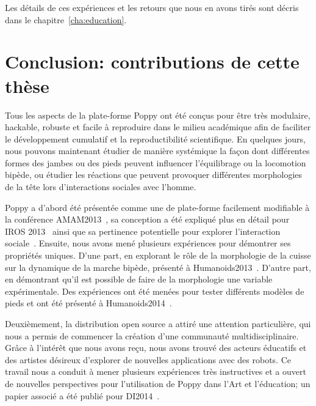 Les détails de ces expériences et les retours que nous en avons tirés sont décris dans le chapitre~\ref{cha:education}.


\section*{Conclusion: contributions de cette thèse} %

Tous les aspects de la plate-forme Poppy ont été conçus pour être très modulaire, hackable, robuste et facile à reproduire dans le milieu académique afin de faciliter le développement cumulatif et la reproductibilité scientifique. En quelques jours, nous pouvons maintenant étudier de manière systémique la façon dont différentes formes des jambes ou des pieds peuvent influencer l'équilibrage ou la locomotion bipède, ou étudier les réactions que peuvent provoquer différentes morphologies de la tête lors d’interactions sociales avec l'homme.

Poppy a d'abord été présentée comme une de plate-forme facilement modifiable à la conférence AMAM2013~\parencite{lapeyre:hal-00788433}, sa conception a été expliqué plus en détail pour IROS 2013~\parencite{lapeyre:hal-00852858} ainsi que sa pertinence potentielle pour explorer l'interaction sociale~\parencite{lapeyre:hal-00984312}. Ensuite, nous avons mené plusieurs expériences pour démontrer ses propriétés uniques. D'une part, en explorant le rôle de la morphologie de la cuisse sur la dynamique de la marche bipède, présenté à Humanoids2013~\parencite{lapeyre:hal-00861110}. D'autre part, en démontrant qu'il est possible de faire de la morphologie une variable expérimentale. Des expériences ont été menées pour tester différents modèles de pieds et ont été présenté à Humanoids2014~\parencite{lapeyre2014humanoids}.

Deuxièmement, la distribution open source a attiré une attention particulière, qui nous a permis de commencer la création d'une communauté multidisciplinaire. Grâce à l'intérêt que nous avons reçu, nous avons trouvé des acteurs éducatifs et des artistes désireux d'explorer de nouvelles applications avec des robots. Ce travail nous a conduit à mener plusieurs expériences très instructives et a ouvert de nouvelles perspectives pour l'utilisation de Poppy dans l'Art et l'éducation; un papier associé a été publié pour DI2014~\parencite{lapeyreDI}.

